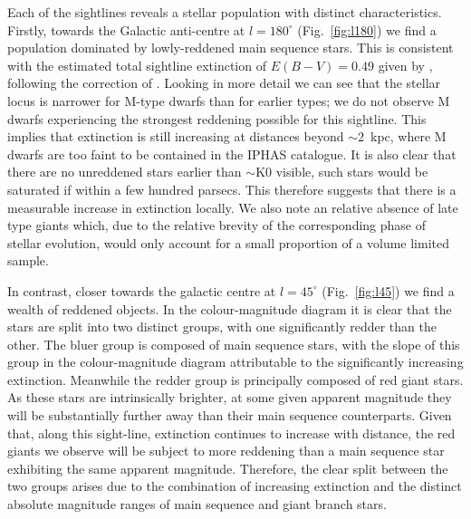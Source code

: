 \documentclass[useAMS,usenatbib]{mn2e}
\begin{document}
Each of the sightlines reveals a stellar population
with distinct characteristics.
Firstly, towards the Galactic anti-centre at $l=180^\circ$ (Fig.~\ref{fig:l180}) 
we find a population dominated by lowly-reddened main sequence stars.
This is consistent with the estimated total sightline extinction of $E(B-V)=0.49$
given by \cite{Schlegel1998}, following the correction of \cite{Schlafly2011}.
Looking in more detail we can see that the stellar locus is narrower for M-type dwarfs than for earlier types;
we do not observe M dwarfs experiencing the strongest reddening possible for this sightline.
This implies that extinction is still increasing at distances beyond $\sim 2$~kpc,
where M dwarfs are too faint to be contained in the IPHAS catalogue.
It is also clear that there are no unreddened stars earlier than $\sim$K0 visible,
such stars would be saturated if within a few hundred parsecs.
This therefore suggests that there is a measurable increase in extinction locally.
We also note an relative absence of late type giants which,
due to the relative brevity of the corresponding phase of stellar evolution,
would only account for a small proportion of a volume limited sample.

 
In contrast, 
closer towards the galactic centre at $l=45^{\circ}$ (Fig.~\ref{fig:l45}) we find a wealth of reddened objects.
In the colour-magnitude diagram it is clear that the stars are split into two distinct groups,
with one significantly redder than the other.
The bluer group is composed of main sequence stars,
with the slope of this group in the colour-magnitude diagram attributable to the significantly increasing extinction.
Meanwhile the redder group is principally composed of red giant stars.
As these stars are intrinsically brighter,
at some given apparent magnitude they will be substantially further away than their main sequence counterparts.
Given that, along this sight-line,
extinction continues to increase with distance,
the red giants we observe will be subject to more reddening than a main sequence star exhibiting the same apparent magnitude.
Therefore, the clear split between the two groups arises due to the combination of increasing extinction and the distinct absolute magnitude ranges of main sequence and giant branch stars.
\end{document}
